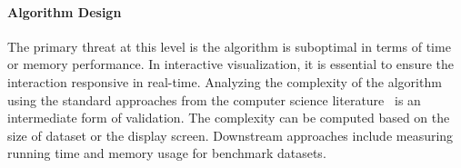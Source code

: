 \paragraph{Algorithm Design}
The primary threat at this level is the algorithm is suboptimal in terms of time or memory performance. In interactive visualization, it is essential to ensure the interaction responsive in real-time. Analyzing the complexity of the algorithm using the standard approaches from the computer science literature~\cite{Cormen2009} is an intermediate form of validation. The complexity can be computed based on the size of dataset or the display screen. Downstream approaches include measuring running time and memory usage for benchmark datasets.













